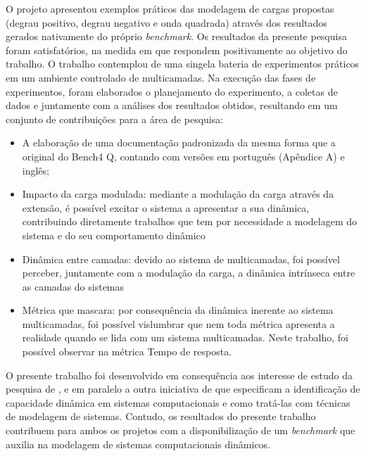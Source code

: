 O projeto apresentou exemplos práticos das modelagem de cargas propostas (degrau positivo, degrau negativo e onda quadrada) através dos resultados gerados nativamente do próprio \textit{benchmark}. Os resultados da presente pesquisa foram satisfatórios, na medida em que respondem positivamente ao objetivo do trabalho. O trabalho contemplou de uma singela bateria de experimentos práticos em um ambiente controlado de multicamadas. Na execução das fases de experimentos, foram elaborados o planejamento do experimento, a coletas de dados e juntamente com a análises dos resultados obtidos, resultando em um conjunto de contribuições para a área de pesquisa:
\begin{itemize}
	\item A elaboração de uma documentação padronizada da mesma forma que a original do Bench4 Q, contando com versões em português (Apêndice A) e inglês;
	\item Impacto da carga modulada: mediante a modulação da carga através da extensão, é possível excitar o sistema a apresentar a sua dinâmica, contribuindo diretamente trabalhos que tem por necessidade a modelagem do sistema e do seu comportamento dinâmico
	\item Dinâmica entre camadas: devido ao sistema de multicamadas, foi possível perceber, juntamente com a modulação da carga, a dinâmica intrínseca entre as camadas do sistemas 
	\item Métrica que mascara: por consequência da dinâmica inerente ao sistema multicamadas, foi possível vislumbrar que nem toda métrica apresenta a realidade quando se lida com um sistema multicamadas. Neste trabalho, foi possível observar na métrica Tempo de resposta.
\end{itemize} 

O presente trabalho foi desenvolvido em consequência aos interesse de estudo da pesquisa de , e em paralelo a outra iniciativa de  que especificam a identificação de capacidade dinâmica em sistemas computacionais e como tratá-las com técnicas de modelagem de sistemas. Contudo, os resultados do presente trabalho contribuem para ambos os projetos com a disponibilização de um \textit{benchmark} que auxilia na modelagem de sistemas computacionais dinâmicos.

